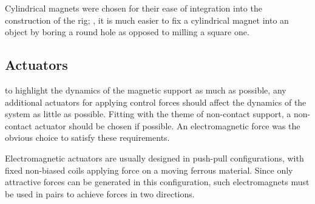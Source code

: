 \documentclass[11pt,a4paper]{memoir}
\begin{document}
Cylindrical magnets were chosen for their ease of integration into the
construction of the rig; \eg, it is much easier to fix a cylindrical magnet
into an object by boring a round hole as opposed to milling a square one.

\begin{comment}
A cylindrical magnet with slightly greater diameter than height was chosen in
order to match the force \vs\ distance characteristic with that of a cuboid
magnet; it can be shown that the force between two inline magnets is the same
for both cube shapes of a certain height and for cylinders with that same
height and equal face area, such as shown in \figref{equal-area}.

\begin{figure}
  \asyinclude{PhD/Figures/Magnets/equal-area}
  \caption{A circle and square of equal area (to scale).}
  \figlabel{equal-area}
\end{figure}

For cylindrical magnet of diameter \SI{12.7}{mm}, the side length required to
achieve the same force curve as a cube magnet is \SI{11.3}{mm}, which is
somewhat larger than that of the actual magnet sourced for the apparatus.
However, it is was as close as possible to the desired size, and other factors
involved in the design (misalignment of the magnet centres, for example) will
act to reduce the total force slightly. For the purposes of the later
simulations, the magnetic forces will be assumed to be
generated by cube magnets of side length \SI{9.5}{mm}.
\end{comment}

\subsection{Actuators}

to highlight the dynamics of the magnetic support as much as possible, any
additional actuators for applying control forces should affect the dynamics of
the system as little as possible. Fitting with the theme of non-contact
support, a non-contact actuator should be chosen if possible. An
electromagnetic force was the obvious choice to satisfy these requirements.

Electromagnetic actuators are usually designed in push-pull configurations,
with fixed non-biased coils applying force on a moving ferrous material. Since
only attractive forces can be generated in this configuration, such
electromagnets must be used in pairs to achieve forces in two directions.
\end{document}
